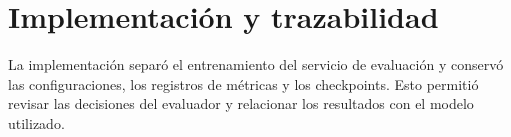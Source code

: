 \section{Implementación y trazabilidad}
\label{sec:contribuciones-implementacion}

La implementación separó el entrenamiento del servicio de evaluación y conservó las configuraciones, los registros de métricas y los checkpoints. Esto permitió revisar las decisiones del evaluador y relacionar los resultados con el modelo utilizado.